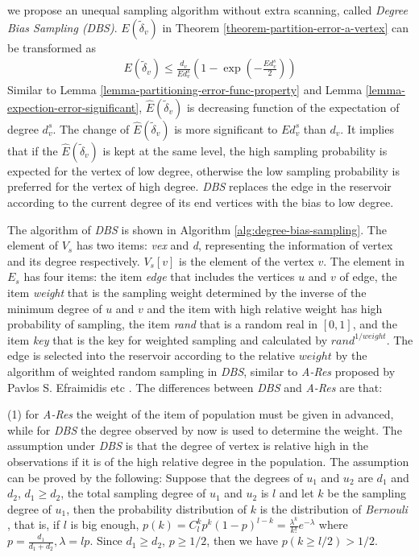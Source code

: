 \documentclass{sig-alternate-2013}
\begin{document}
we propose an unequal sampling algorithm without extra scanning, called \textit{Degree Bias Sampling (DBS)}.
$E(\tilde\delta_v)$ in Theorem \ref{theorem-partition-error-a-vertex} can be transformed as
\begin{eqnarray}\label{lemma-partitioning-error-func-of-expection-of-d}
{E(\tilde\delta_v)} \leq \frac{d_v}{Ed_v^s} (1-\exp(-\frac{Ed_v^s}{2}))
\end{eqnarray}
Similar to Lemma \ref{lemma-partitioning-error-func-property} and Lemma \ref{lemma-expection-error-significant}, $\hat{E}(\tilde\delta_v)$ is decreasing function of the expectation of degree $d_v^s$. The change of $\hat{E}(\tilde\delta_v)$ is more significant to $Ed_v^s$ than $d_v$. It implies that if the $\hat{E}(\tilde\delta_v)$ is kept at the same level, the high sampling probability is expected for the vertex of low degree, otherwise the low sampling probability is preferred for the vertex of high degree. \textit{DBS} replaces the edge in the reservoir according to the current degree of its end vertices with the bias to low degree.

The algorithm of \textit{DBS} is shown in Algorithm \ref{alg:degree-bias-sampling}. The element of $V_s$ has two items: \textit{vex} and \textit{d}, representing the information of vertex and its degree respectively. $V_s[v]$ is the element of the vertex $v$. The element in $E_s$ has four items: the item \textit{edge} that includes the vertices $u$ and $v$ of edge, the item \textit{weight} that is the sampling weight determined by the inverse of the minimum degree of $u$ and $v$ and the item with high relative weight has high probability of sampling,  the item \textit{rand} that is a random real in $[0,1]$, and the item \textit{key} that is the key for weighted sampling and calculated by ${rand}^{1/weight}$.   The edge is selected into the reservoir according to the relative $weight$ by the algorithm of weighted random sampling in \textit{DBS}, similar to \textit{A-Res} proposed by Pavlos S. Efraimidis etc \cite{Pavlos:weightedsampling}. The differences between \textit{DBS} and \textit{A-Res} are that:

(1)  for \textit{A-Res} the weight of the item of population must be given in advanced, while for \textit{DBS} the degree observed by now is used to determine the weight. The assumption under \textit{DBS} is that  the degree of vertex is relative high in the observations if it is of the high relative degree in the population.  The assumption can be proved by the following:
Suppose that the degrees of $u_1$ and $u_2$ are $d_1$ and $d_2$, $d_1\ge d_2$,  the total sampling degree of  $u_1$ and $u_2$ is $l$ and let $k$ be the sampling degree of $u_1$, then the probability distribution of $k$ is the distribution of \textit{Bernouli} , that is, if $l$ is big enough,  $ p(k)=C_l^k p^k(1-p)^{l-k} = \frac{\lambda^k}{k!} e^{-\lambda}$ where $p=\frac{d_1}{d_1+d_2}, \lambda = l p$. Since $d_1\ge d_2$, $p\ge1/2$, then we have $p(k\ge l/2)>1/2$.
\end{document}
